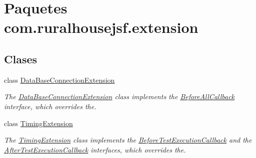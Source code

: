 \hypertarget{namespacecom_1_1ruralhousejsf_1_1extension}{}\section{Paquetes com.\+ruralhousejsf.\+extension}
\label{namespacecom_1_1ruralhousejsf_1_1extension}
\subsection*{Clases}
\begin{DoxyCompactItemize}
\item 
class \mbox{\hyperlink{classcom_1_1ruralhousejsf_1_1extension_1_1_data_base_connection_extension}{Data\+Base\+Connection\+Extension}}
\begin{DoxyCompactList}\small\item\em The \mbox{\hyperlink{classcom_1_1ruralhousejsf_1_1extension_1_1_data_base_connection_extension}{Data\+Base\+Connection\+Extension}} class implements the \mbox{\hyperlink{}{Before\+All\+Callback}} interface, which overrides the. \end{DoxyCompactList}\item 
class \mbox{\hyperlink{classcom_1_1ruralhousejsf_1_1extension_1_1_timing_extension}{Timing\+Extension}}
\begin{DoxyCompactList}\small\item\em The \mbox{\hyperlink{classcom_1_1ruralhousejsf_1_1extension_1_1_timing_extension}{Timing\+Extension}} class implements the \mbox{\hyperlink{}{Before\+Test\+Execution\+Callback}} and the \mbox{\hyperlink{}{After\+Test\+Execution\+Callback}} interfaces, which overrides the. \end{DoxyCompactList}\end{DoxyCompactItemize}
